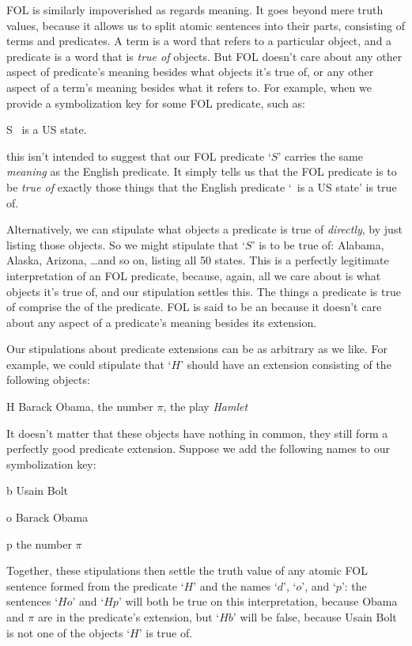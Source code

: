 FOL is similarly impoverished as regards meaning. It goes beyond mere truth values, because it  allows us to split atomic sentences into their parts, consisting of terms and predicates.  A term is a word that refers to a particular object, and a predicate is a word that is \emph{true of} objects.  But FOL doesn't care about any other aspect of predicate's meaning besides what objects it's true of, or any other aspect of a term's meaning besides what it refers to.  For example, when we provide a symbolization key for some FOL predicate, such as:
	\begin{ekey}
		\item[S] \blank\ is a US state.
	\end{ekey}
this isn't intended to suggest that our FOL predicate `$S$' carries the same \emph{meaning} as the English predicate.  It simply tells us that the FOL predicate is to be \emph{true of} exactly those things that the English predicate `\blank \ is a US state' is true of.

Alternatively, we can stipulate what objects a predicate is true of \emph{directly}, by just listing those objects.  So we might stipulate that `$S$' is to be true of: Alabama, Alaska, Arizona, \ldots and so on, listing all 50 states.  This is a perfectly legitimate interpretation of an FOL predicate, because, again, all we care about is what objects it's true of, and our stipulation settles this.  The things a predicate is true of comprise the  of the predicate.  FOL is said to be an   because it doesn't care about any aspect of a predicate's meaning besides its extension.

Our stipulations about predicate extensions can be as arbitrary as we like. For example, we could stipulate that `$H$' should have an extension consisting of the following objects:
	\begin{ekey}
		\item[H] Barack Obama, the number $\pi$, the play \emph{Hamlet}
	\end{ekey}
It doesn't matter that these objects have nothing in common, they still form a perfectly good predicate extension.  Suppose we add the following names to our symbolization key:
	\begin{ekey}
		\item[b] Usain Bolt
		\item[o] Barack Obama
		\item[p] the number $\pi$
	\end{ekey}
Together, these stipulations then settle the truth value of any atomic FOL sentence formed from the predicate `$H$' and the names `$d$', `$o$', and `$p$': the sentences `$Ho$' and `$Hp$' will both be true on this interpretation, because Obama and $\pi$ are in the predicate's extension, but `$Hb$' will be false, because Usain Bolt is not one of the objects `$H$' is true of.

